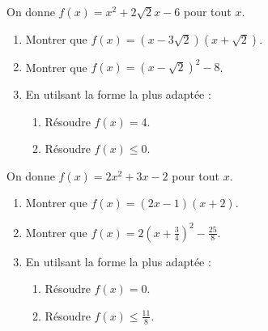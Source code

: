 \begin{multicols}{2}
\begin{exo}
 On donne $f(x)=x^2+2\sqrt{2} x-6$ pour tout $x$.
 \begin{enumerate}
  \item Montrer que $f(x)=(x-3\sqrt{2})(x+\sqrt{2})$.
  \item Montrer que $f(x)=(x-\sqrt{2})^2-8$.
  \item En utilsant la forme la plus adapt\'ee :
	\begin{enumerate}
	 \item R\'esoudre $f(x)=4$.
	 \item R\'esoudre $f(x)\leqslant 0$.
	\end{enumerate}
 \end{enumerate}
\end{exo}

\begin{exo}
 On donne $f(x)=2x^2+3x-2$ pour tout $x$.
 \begin{enumerate}
  \item Montrer que $f(x)=(2x-1)(x+2)$.
  \item Montrer que $f(x)=2\left(x+\frac{3}{4}\right)^2-\frac{25}{8}$.
  \item En utilsant la forme la plus adapt\'ee :
	\begin{enumerate}
	 \item R\'esoudre $f(x)=0$.
	 \item R\'esoudre $f(x)\leqslant \frac{11}{8}$.
	\end{enumerate}
 \end{enumerate}
\end{exo}



\end{multicols}
